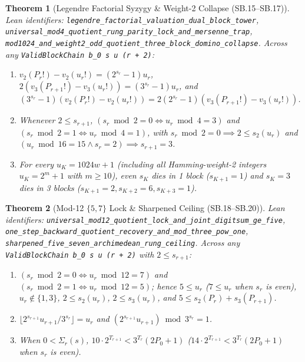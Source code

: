 \documentclass[11pt]{article}
\newtheorem{theorem}{Theorem}[section]
\begin{document}
\begin{theorem}[Legendre Factorial Syzygy \& Weight-2 Collapse (SB.15--SB.17)]
\emph{Lean identifiers:} \nolinkurl{legendre_factorial_valuation_dual_block_tower}, \nolinkurl{universal_mod4_quotient_rung_parity_lock_and_mersenne_trap}, \nolinkurl{mod1024_and_weight2_odd_quotient_three_block_domino_collapse}.
Across any \texttt{ValidBlockChain b\_0 s u (r + 2)}:
\begin{enumerate}
  \item $v_2(P_r!) - v_2(u_r!) = (2^{s_r} - 1) u_r$, $2(v_3(P_{r+1}!) - v_3(u_r!)) = (3^{s_r} - 1) u_r$, and $(3^{s_r} - 1)(v_2(P_r!) - v_2(u_r!)) = 2(2^{s_r} - 1)(v_3(P_{r+1}!) - v_3(u_r!))$.
  \item Whenever $2 \le s_{r+1}$, $(s_r \bmod 2 = 0 \iff u_r \bmod 4 = 3)$ and $(s_r \bmod 2 = 1 \iff u_r \bmod 4 = 1)$, with $s_r \bmod 2 = 0 \implies 2 \le s_2(u_r)$ and $(u_r \bmod 16 = 15 \wedge s_r = 2) \implies s_{r+1} = 3$.
  \item For every $u_K = 1024 w + 1$ (including all Hamming-weight-2 integers $u_K = 2^m + 1$ with $m \ge 10$), even $s_K$ dies in 1 block ($s_{K+1} = 1$) and $s_K = 3$ dies in 3 blocks ($s_{K+1} = 2, s_{K+2} = 6, s_{K+3} = 1$).
\end{enumerate}
\end{theorem}

\begin{theorem}[Mod-12 $\{5,7\}$ Lock \& Sharpened Ceiling (SB.18--SB.20)]
\emph{Lean identifiers:} \nolinkurl{universal_mod12_quotient_lock_and_joint_digitsum_ge_five}, \nolinkurl{one_step_backward_quotient_recovery_and_mod_three_pow_one}, \nolinkurl{sharpened_five_seven_archimedean_rung_ceiling}.
Across any \texttt{ValidBlockChain b\_0 s u (r + 2)} with $2 \le s_{r+1}$:
\begin{enumerate}
  \item $(s_r \bmod 2 = 0 \iff u_r \bmod 12 = 7)$ and $(s_r \bmod 2 = 1 \iff u_r \bmod 12 = 5)$; hence $5 \le u_r$ ($7 \le u_r$ when $s_r$ is even), $u_r \notin \{1, 3\}$, $2 \le s_2(u_r)$, $2 \le s_3(u_r)$, and $5 \le s_2(P_r) + s_3(P_{r+1})$.
  \item $\lfloor 2^{s_{r+1}} u_{r+1} / 3^{s_r} \rfloor = u_r$ and $(2^{s_{r+1}} u_{r+1}) \bmod 3^{s_r} = 1$.
  \item When $0 < \Sigma_r(s)$, $10 \cdot 2^{T_{r+1}} < 3^{T_r}(2 P_0 + 1)$ ($14 \cdot 2^{T_{r+1}} < 3^{T_r}(2 P_0 + 1)$ when $s_r$ is even).
\end{enumerate}
\end{theorem}
\end{document}

